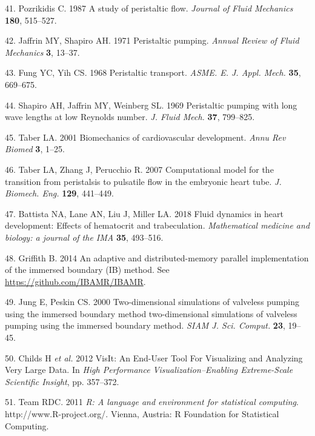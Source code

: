 \documentclass[
]{article}
\newenvironment{cslreferences}%
  {}%
  {\par}
\begin{document}
\begin{cslreferences}
\leavevmode\hypertarget{ref-Pozrikidis:87}{}%
41. Pozrikidis C. 1987 A study of peristaltic flow. \emph{Journal of
Fluid Mechanics} \textbf{180}, 515--527.

\leavevmode\hypertarget{ref-Jaffrin:71}{}%
42. Jaffrin MY, Shapiro AH. 1971 Peristaltic pumping. \emph{Annual
Review of Fluid Mechanics} \textbf{3}, 13--37.

\leavevmode\hypertarget{ref-Fung:68}{}%
43. Fung YC, Yih CS. 1968 Peristaltic transport. \emph{ASME. E. J. Appl.
Mech.} \textbf{35}, 669--675.

\leavevmode\hypertarget{ref-Shapiro:69}{}%
44. Shapiro AH, Jaffrin MY, Weinberg SL. 1969 Peristaltic pumping with
long wave lengths at low Reynolds number. \emph{J. Fluid Mech.}
\textbf{37}, 799--825.

\leavevmode\hypertarget{ref-Taber:2001}{}%
45. Taber LA. 2001 Biomechanics of cardiovascular development.
\emph{Annu Rev Biomed} \textbf{3}, 1--25.

\leavevmode\hypertarget{ref-Taber:2007}{}%
46. Taber LA, Zhang J, Perucchio R. 2007 Computational model for the
transition from peristalsis to pulsatile flow in the embryonic heart
tube. \emph{J. Biomech. Eng.} \textbf{129}, 441--449.

\leavevmode\hypertarget{ref-Battista:2018}{}%
47. Battista NA, Lane AN, Liu J, Miller LA. 2018 Fluid dynamics in heart
development: Effects of hematocrit and trabeculation. \emph{Mathematical
medicine and biology: a journal of the IMA} \textbf{35}, 493--516.

\leavevmode\hypertarget{ref-Griffith:2014}{}%
48. Griffith B. 2014 An adaptive and distributed-memory parallel
implementation of the immersed boundary (IB) method. See
\url{https://github.com/IBAMR/IBAMR}.

\leavevmode\hypertarget{ref-Jung:2000}{}%
49. Jung E, Peskin CS. 2000 Two-dimensional simulations of valveless
pumping using the immersed boundary method two-dimensional simulations
of valveless pumping using the immersed boundary method. \emph{SIAM J.
Sci. Comput.} \textbf{23}, 19--45.

\leavevmode\hypertarget{ref-HPV:VisIt}{}%
50. Childs H \emph{et al.} 2012 VisIt: An End-User Tool For Visualizing
and Analyzing Very Large Data. In \emph{High Performance
Visualization--Enabling Extreme-Scale Scientific Insight}, pp. 357--372.

\leavevmode\hypertarget{ref-R:2011}{}%
51. Team RDC. 2011 \emph{R: A language and environment for statistical
computing}. http://www.R-project.org/. Vienna, Austria: R Foundation for
Statistical Computing.
\end{cslreferences}
\end{document}
